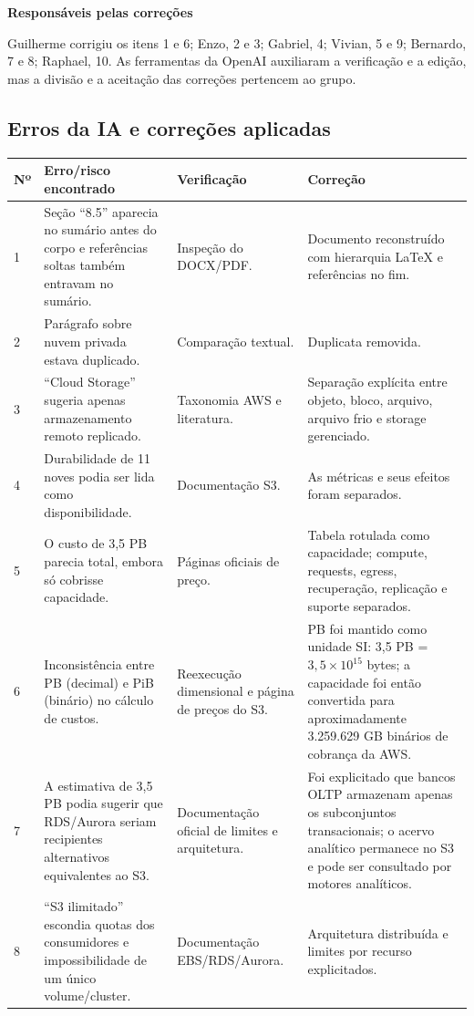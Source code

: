 \documentclass[11pt,a4paper]{article}
\newcommand{\destaque}[2]{\begin{center}\begin{minipage}{.96\textwidth}
  \colorbox{fundo}{\begin{minipage}{\dimexpr\linewidth-2\fboxsep}
  \textbf{\color{azul}#1}\par\small #2\end{minipage}}\end{minipage}\end{center}}
\begin{document}
\destaque{Responsáveis pelas correções}{Guilherme corrigiu os itens 1 e 6; Enzo, 2 e 3; Gabriel,
4; Vivian, 5 e 9; Bernardo, 7 e 8; Raphael, 10. As ferramentas da OpenAI auxiliaram a verificação e a edição, mas a
divisão e a aceitação das correções pertencem ao grupo.}

\subsection{Erros da IA e correções aplicadas}
\begin{longtable}{@{}p{.7cm}p{5cm}p{4.4cm}p{4.6cm}@{}}\toprule
\textbf{Nº} & \textbf{Erro/risco encontrado} & \textbf{Verificação} & \textbf{Correção}\\\midrule\endhead
1 & Seção ``8.5'' aparecia no sumário antes do corpo e referências soltas também entravam no sumário. & Inspeção do DOCX/PDF. & Documento reconstruído com hierarquia LaTeX e referências no fim.\\
2 & Parágrafo sobre nuvem privada estava duplicado. & Comparação textual. & Duplicata removida.\\
3 & ``Cloud Storage'' sugeria apenas armazenamento remoto replicado. & Taxonomia AWS e literatura. & Separação explícita entre objeto, bloco, arquivo, arquivo frio e storage gerenciado.\\
4 & Durabilidade de 11 noves podia ser lida como disponibilidade. & Documentação S3. & As métricas e seus efeitos foram separados.\\
5 & O custo de 3,5 PB parecia total, embora só cobrisse capacidade. & Páginas oficiais de preço. & Tabela rotulada como capacidade; compute, requests, egress, recuperação, replicação e suporte separados.\\
6 & Inconsistência entre PB (decimal) e PiB (binário) no cálculo de custos. & Reexecução dimensional e página de preços do S3. & PB foi mantido como unidade SI: 3,5 PB = $3,5\times10^{15}$ bytes; a capacidade foi então convertida para aproximadamente 3.259.629 GB binários de cobrança da AWS.\\
7 & A estimativa de 3,5 PB podia sugerir que RDS/Aurora seriam recipientes alternativos equivalentes ao S3. & Documentação oficial de limites e arquitetura. & Foi explicitado que bancos OLTP armazenam apenas os subconjuntos transacionais; o acervo analítico permanece no S3 e pode ser consultado por motores analíticos.\\
8 & ``S3 ilimitado'' escondia quotas dos consumidores e impossibilidade de um único volume/cluster. & Documentação EBS/RDS/Aurora. & Arquitetura distribuída e limites por recurso explicitados.\\

\end{longtable}
\end{document}
